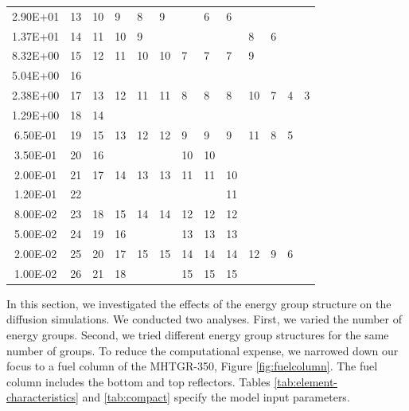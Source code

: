 \begin{table}[htbp!]
\begin{tabular}{c|l|l|l|l|l|l|l|l|l|l|l|l}
  2.90E+01            & 13    & 10   & 9    & 8   & 9   &     & 6   & 6     &     &    &    &   \\ \cline{1-5} \cline{10-11}
  1.37E+01            & 14    & 11   & 10   & 9   &     &     &     &       & 8   & 6  &    &   \\ \cline{1-10}
  8.32E+00            & 15    & 12   & 11   & 10  & 10  & 7   & 7   & 7     & 9   &    &    &   \\ \cline{1-2}
  5.04E+00            & 16    &      &      &     &     &     &     &       &     &    &    &   \\ \hline
  2.38E+00            & 17    & 13   & 12   & 11  & 11  & 8   & 8   & 8     & 10  & 7  & 4  & 3 \\ \cline{1-3}
  1.29E+00            & 18    & 14   &      &     &     &     &     &       &     &    &    &   \\ \cline{1-12} 
  6.50E-01            & 19    & 15   & 13   & 12  & 12  & 9   & 9   & 9     & 11  & 8  & 5  &   \\ \cline{1-3} \cline{7-8}
  3.50E-01            & 20    & 16   &      &     &     & 10  & 10  &       &     &    &    &   \\ \cline{1-9}
  2.00E-01            & 21    & 17   & 14   & 13  & 13  & 11  & 11  & 10    &     &    &    &   \\ \cline{1-2} \cline{9-9}
  1.20E-01            & 22    &      &      &     &     &     &     & 11    &     &    &    &   \\ \cline{1-9} 
  8.00E-02            & 23    & 18   & 15   & 14  & 14  & 12  & 12  & 12    &     &    &    &   \\ \cline{1-4} \cline{7-9}
  5.00E-02            & 24    & 19   & 16   &     &     & 13  & 13  & 13    &     &    &    &   \\ \hline
  2.00E-02            & 25    & 20   & 17   & 15  & 15  & 14  & 14  & 14    & 12  & 9  & 6  &   \\ \cline{1-4} \cline{7-9}
  1.00E-02            & 26    & 21   & 18   &     &     & 15  & 15  & 15    &     &    &    &   \\
  \bottomrule
  \end{tabular}
  \label{tab:energygroups}
\end{table}

In this section, we investigated the effects of the energy group structure on the diffusion simulations.
We conducted two analyses.
First, we varied the number of energy groups.
Second, we tried different energy group structures for the same number of groups.
To reduce the computational expense, we narrowed down our focus to a fuel column of the MHTGR-350, Figure \ref{fig:fuelcolumn}.
The fuel column includes the bottom and top reflectors.
Tables \ref{tab:element-characteristics} and \ref{tab:compact} specify the model input parameters.

